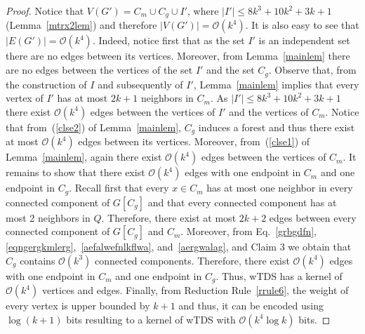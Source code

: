 \documentclass[a4paper,11pt]{article}
\newcommand{\Oh}{{\mathcal{O}}}
\begin{document}
\begin{proof}
Notice that $V(G')=C_{m}\cup C_{g} \cup I'$, where $|I'|\leq 8k^{3}+10k^{2}+3k+1$ (Lemma~\ref{mtrx2lem}) and therefore $|V(G')|=\Oh(k^{4})$.
It is also easy to see that $|E(G')|=\Oh(k^{4})$. Indeed, notice first that as the set $I'$ is an independent set there are no edges between its vertices. Moreover,
from Lemma~\ref{mainlem} there are no edges between the vertices of the set $I'$ and the set $C_{g}$. Observe that, from the construction of $I$ and subsequently
of $I'$, Lemma~\ref{mainlem} implies that every vertex of $I'$ has at most $2k+1$ neighbors in $C_{m}$. As $|I'| \leq 8k^{3}+10k^{2}+3k+1$ there exist $\Oh(k^{4})$
edges between the vertices of $I'$ and the vertices of $C_{m}$. Notice that from~(\ref{clse2}) of Lemma~\ref{mainlem}, $C_{g}$ induces a forest and thus there 
exist at most $\Oh(k^{4})$ edges between its vertices. Moreover, from~(\ref{clse1}) of Lemma~\ref{mainlem}, again there exist $\Oh(k^{4})$ edges between the 
vertices of $C_{m}$. It remains to show that there exist $\Oh(k^{4})$ edges with one endpoint in $C_{m}$ and one endpoint in $C_{g}$. Recall first that 
every $x\in C_{m}$ has at most one neighbor in every  connected component of $G[C_{g}]$ and that every connected component has at most 2 neighbors in
$Q$. Therefore, there exist at most $2k+2$ edges between every connected component of $G[C_{g}]$ and $C_{m}$. 
Moreover, from Eq.~\eqref{grbgdfn},\eqref{eqngergkmlerg},~\eqref{aefalwefnlkflwa}, and~\eqref{aergwalag}, and Claim 3 we obtain that $C_{g}$ contains 
$\Oh(k^{3})$ connected components. Therefore, there exist $\Oh(k^{4})$ edges with one endpoint in $C_{m}$ and one endpoint in $C_{g}$.
Thus, {\sc wTDS} has a kernel of $\Oh(k^{4})$ vertices and edges. 
Finally, from Reduction Rule~\ref{rrule6}, the weight of every vertex is upper bounded by $k+1$ and thus, it can be encoded using $\log (k+1)$ bits resulting to a
kernel of {\sc  wTDS} with $\Oh(k^{4}\log k)$ bits.
\end{proof}
\newpage


\end{document}
